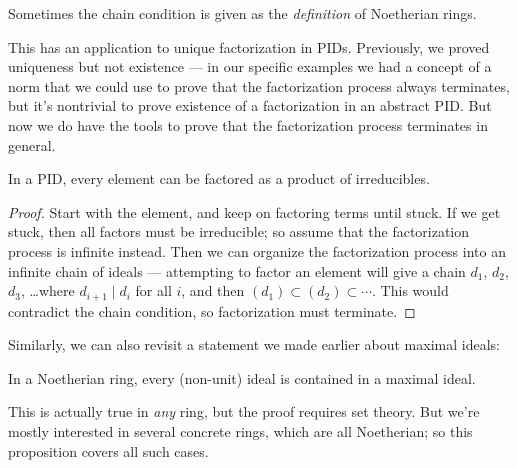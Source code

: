 \begin{note}
    Sometimes the chain condition is given as the \emph{definition} of Noetherian rings. 
\end{note}

This has an application to unique factorization in PIDs. Previously, we proved uniqueness but not existence --- in our specific examples we had a concept of a norm that we could use to prove that the factorization process always terminates, but it's nontrivial to prove existence of a factorization in an abstract PID. But now we do have the tools to prove that the factorization process terminates in general. 

\begin{corollary}
    In a PID, every element can be factored as a product of irreducibles. 
\end{corollary}

\begin{proof}
    Start with the element, and keep on factoring terms until stuck. If we get stuck, then all factors must be irreducible; so assume that the factorization process is infinite instead. Then we can organize the factorization process into an infinite chain of ideals --- attempting to factor an element will give a chain $d_1$, $d_2$, $d_3$, \ldots where $d_{i + 1} \mid d_i$ for all $i$, and then $(d_1) \subset (d_2) \subset \cdots$. This would contradict the chain condition, so factorization must terminate. 
\end{proof}



Similarly, we can also revisit a statement we made earlier about maximal ideals:

\begin{proposition}
    In a Noetherian ring, every (non-unit) ideal is contained in a maximal ideal. 
\end{proposition}

This is actually true in \emph{any} ring, but the proof requires set theory. But we're mostly interested in several concrete rings, which are all Noetherian; so this proposition covers all such cases. 

